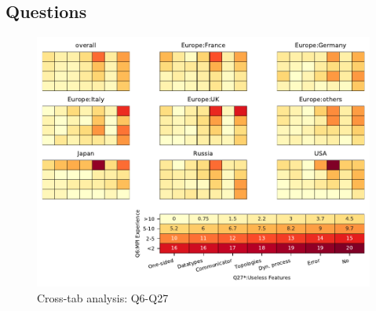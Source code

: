 
\subsection{Questions}


\begin{figure}
\begin{center}
\includegraphics[width=12cm]{../pdfs/Q6-Q27.pdf}
\caption{Cross-tab analysis: Q6-Q27}
\label{fig:Q6-Q27}
\end{center}
\end{figure}
